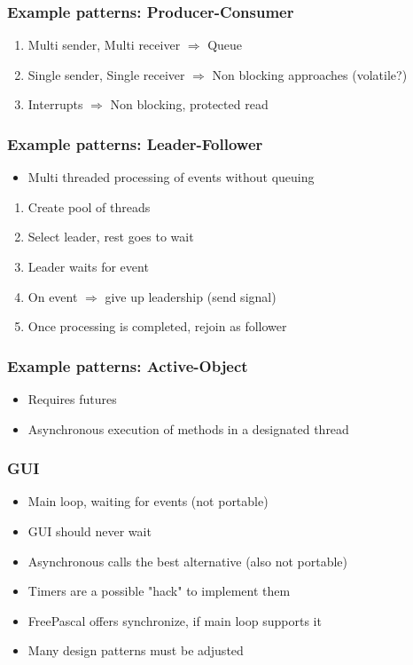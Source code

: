 \documentclass{beamer}
\begin{document}
\begin{frame}
\frametitle{Example patterns: Producer-Consumer}
\begin{enumerate}
 \item Multi sender, Multi receiver $\Rightarrow$ Queue
 \item Single sender, Single receiver $\Rightarrow$ Non blocking approaches (volatile?)
 \item Interrupts $\Rightarrow$ Non blocking, protected read
\end{enumerate}
\end{frame}

\begin{frame}
\frametitle{Example patterns: Leader-Follower}
\begin{itemize}
 \item Multi threaded processing of events without queuing
\end{itemize}
\begin{enumerate}
 \item Create pool of threads
 \item Select leader, rest goes to wait
 \item Leader waits for event
 \item On event $\Rightarrow$ give up leadership (send signal)
 \item Once processing is completed, rejoin as follower
\end{enumerate}
\end{frame}

\begin{frame}
\frametitle{Example patterns: Active-Object}
\begin{itemize}
 \item Requires futures
 \item Asynchronous execution of methods in a designated thread
\end{itemize}
\end{frame}

\begin{frame}
\frametitle{GUI}
\begin{itemize}
 \item Main loop, waiting for events (not portable)
 \item GUI should never wait
 \item Asynchronous calls the best alternative (also not portable)
 \item Timers are a possible "hack" to implement them
 \item FreePascal offers synchronize, if main loop supports it
 \item Many design patterns must be adjusted
\end{itemize}
\end{frame}
\end{document}
